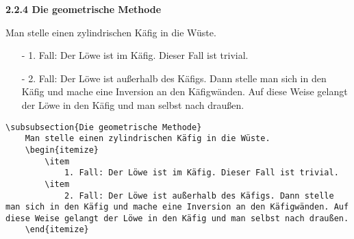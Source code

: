 \documentclass["WS\space 16-17\space -\space LaTeX-Kurs\space -\space Praesentation\space -\space 2.tex"]{subfiles}
\begin{document}
\begin{frame}[fragile]
	\vspace{-0.2cm}
	\Losung
	\begin{outputbox}
		{\large\textbf{2.2.4 Die geometrische Methode}}
		
		Man stelle einen zylindrischen Käfig in die Wüste.
		\begin{itemize}
			\item[-]
			1. Fall: Der Löwe ist im Käfig. Dieser Fall ist trivial.
			\item[-]
			2. Fall: Der Löwe ist außerhalb des Käfigs. Dann stelle man sich in den Käfig und mache eine Inversion an den Käfigwänden. Auf diese Weise gelangt der Löwe in den Käfig und man selbst nach draußen.
		\end{itemize}
		\vspace{-0.2cm}
	\end{outputbox}

	\Code
	\vspace{-0.1cm}
	\begin{lstlisting}
\subsubsection{Die geometrische Methode}
	Man stelle einen zylindrischen Käfig in die Wüste.
	\begin{itemize}
		\item
			1. Fall: Der Löwe ist im Käfig. Dieser Fall ist trivial.
		\item
			2. Fall: Der Löwe ist außerhalb des Käfigs. Dann stelle man sich in den Käfig und mache eine Inversion an den Käfigwänden. Auf diese Weise gelangt der Löwe in den Käfig und man selbst nach draußen.
	\end{itemize}
	\end{lstlisting}
\end{frame}
\end{document}

